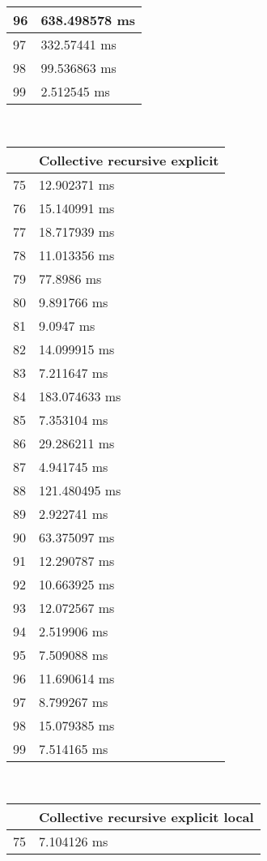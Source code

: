 \begin{multicols}{2}
\begin{tabular}{|l|l|}
		96 & 638.498578 ms \\ \hline
		97 & 332.57441 ms \\ \hline
		98 & 99.536863 ms \\ \hline
		99 & 2.512545 ms \\ \hline
	\end{tabular}\\
	\begin{tabular}{|l|l|}
		\hline
		& Collective recursive explicit \\ \hline
		75 & 12.902371 ms \\ \hline
		76 & 15.140991 ms \\ \hline
		77 & 18.717939 ms \\ \hline
		78 & 11.013356 ms \\ \hline
		79 & 77.8986 ms \\ \hline
		80 & 9.891766 ms \\ \hline
		81 & 9.0947 ms \\ \hline
		82 & 14.099915 ms \\ \hline
		83 & 7.211647 ms \\ \hline
		84 & 183.074633 ms \\ \hline
		85 & 7.353104 ms \\ \hline
		86 & 29.286211 ms \\ \hline
		87 & 4.941745 ms \\ \hline
		88 & 121.480495 ms \\ \hline
		89 & 2.922741 ms \\ \hline
		90 & 63.375097 ms \\ \hline
		91 & 12.290787 ms \\ \hline
		92 & 10.663925 ms \\ \hline
		93 & 12.072567 ms \\ \hline
		94 & 2.519906 ms \\ \hline
		95 & 7.509088 ms \\ \hline
		96 & 11.690614 ms \\ \hline
		97 & 8.799267 ms \\ \hline
		98 & 15.079385 ms \\ \hline
		99 & 7.514165 ms \\ \hline
	\end{tabular}\\
	\begin{tabular}{|l|l|}
		\hline
		& Collective recursive explicit local \\ \hline
		75 & 7.104126 ms \\ \hline

\end{tabular}
\end{multicols}

